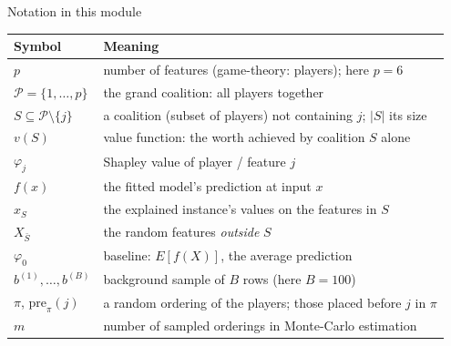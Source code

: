 \documentclass[aspectratio=169,11pt]{beamer}
\begin{document}
\begin{frame}{Notation in this module}
  \footnotesize
  \begin{center}
  \begin{tabular}{@{}ll@{}}
    \toprule
    \textbf{Symbol} & \textbf{Meaning} \\
    \midrule
    $p$ & number of features (game-theory: players); here $p=6$ \\
    $\mathcal{P}=\{1,\dots,p\}$ & the grand coalition: all players together \\
    $S \subseteq \mathcal{P}\setminus\{j\}$ & a coalition (subset of players) not containing $j$; $|S|$ its size \\
    $v(S)$ & value function: the worth achieved by coalition $S$ alone \\
    $\varphi_j$ & Shapley value of player / feature $j$ \\
    $f(x)$ & the fitted model's prediction at input $x$ \\
    $x_S$ & the explained instance's values on the features in $S$ \\
    $X_{\bar S}$ & the random features \emph{outside} $S$ \\
    $\varphi_0$ & baseline: $E[f(X)]$, the average prediction \\
    $b^{(1)},\dots,b^{(B)}$ & background sample of $B$ rows (here $B=100$) \\
    $\pi$, $\mathrm{pre}_\pi(j)$ & a random ordering of the players; those placed before $j$ in $\pi$ \\
    $m$ & number of sampled orderings in Monte-Carlo estimation \\
    \bottomrule
  \end{tabular}
  \end{center}
\end{frame}
\end{document}
